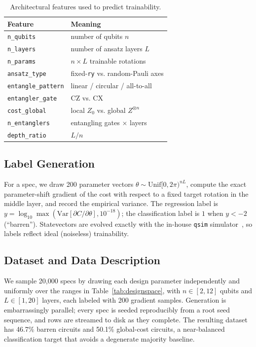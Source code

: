 \documentclass{ieeeaccess}
\newcommand{\Nspecs}{20{,}000}
\newcommand{\Samples}{200}
\newcommand{\QubitLo}{2}
\newcommand{\QubitHi}{12}
\newcommand{\LayerLo}{1}
\newcommand{\LayerHi}{20}
\newcommand{\GlobalFrac}{50.1}
\newcommand{\BarrenFrac}{46.7}
\begin{document}
\begin{table}[!t]
\caption{Architectural features used to predict trainability.}
\label{tab:features}
\centering
\begin{tabular}{@{}ll@{}}
\toprule
Feature & Meaning \\
\midrule
\texttt{n\_qubits} & number of qubits $n$ \\
\texttt{n\_layers} & number of ansatz layers $L$ \\
\texttt{n\_params} & $n\times L$ trainable rotations \\
\texttt{ansatz\_type} & fixed-\texttt{ry} vs. random-Pauli axes \\
\texttt{entangle\_pattern} & linear / circular / all-to-all \\
\texttt{entangler\_gate} & CZ vs. CX \\
\texttt{cost\_global} & local $Z_0$ vs. global $Z^{\otimes n}$ \\
\texttt{n\_entanglers} & entangling gates $\times$ layers \\
\texttt{depth\_ratio} & $L/n$ \\
\bottomrule
\end{tabular}
\end{table}

\subsection{Label Generation}
For a spec, we draw \Samples{} parameter vectors
$\theta\sim\mathrm{Unif}[0,2\pi)^{nL}$, compute the exact parameter-shift gradient
of the cost with respect to a fixed target rotation in the middle layer, and record
the empirical variance. The regression label is
$y=\log_{10}\max(\mathrm{Var}[\partial C/\partial\theta],10^{-18})$; the
classification label is $1$ when $y<-2$ (``barren''). Statevectors are evolved
exactly with the in-house \texttt{qsim} simulator~\cite{eshyana2026}, so labels
reflect ideal (noiseless) trainability.

\subsection{Dataset and Data Description}
We sample \Nspecs{} specs by drawing each design parameter independently and
uniformly over the ranges in Table~\ref{tab:designspace}, with
$n\in[\QubitLo,\QubitHi]$ qubits and $L\in[\LayerLo,\LayerHi]$ layers, each labeled
with \Samples{} gradient samples. Generation is embarrassingly parallel; every spec
is seeded reproducibly from a root seed sequence, and rows are streamed to disk as
they complete. The resulting dataset has \BarrenFrac{}\% barren circuits and
\GlobalFrac{}\% global-cost circuits, a near-balanced classification target that
avoids a degenerate majority baseline.
\end{document}
